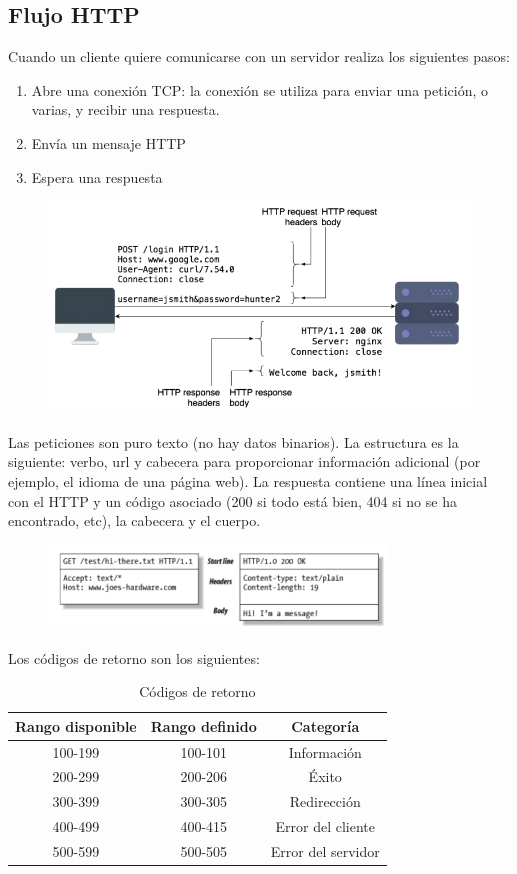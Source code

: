 \subsection{Flujo HTTP}
Cuando un cliente quiere comunicarse con un servidor realiza los siguientes pasos: 
\begin{enumerate}
\item Abre una conexión TCP: la conexión se utiliza para enviar una petición, o varias, y recibir una respuesta.
\item Envía un mensaje HTTP
\item Espera una respuesta
\end{enumerate}
\begin{figure}[htbp]
\centering
\includegraphics[width = \textwidth]{figs/http-flow.png}
\end{figure}

Las peticiones son puro texto (no hay datos binarios). La estructura es la siguiente: verbo, url y cabecera para proporcionar información adicional (por ejemplo, el idioma de una página web). La respuesta contiene una línea inicial con el HTTP y un código asociado (200 si todo está bien, 404 si no se ha encontrado, etc), la cabecera y el cuerpo.
\begin{figure}[htbp]
\centering
\includegraphics[width = 0.8\textwidth]{figs/request-answer.png}
\end{figure}

Los códigos de retorno son los siguientes:
\begin{table}[htbp]
\centering
\begin{tabular}{c | c | c}
Rango disponible & Rango definido & Categoría \\ \hline
100-199 & 100-101 & Información \\
200-299 & 200-206 & Éxito \\
300-399 & 300-305 & Redirección \\
400-499 & 400-415 & Error del cliente \\
500-599 & 500-505 & Error del servidor 
\end{tabular}
\caption{Códigos de retorno}
\end{table}

